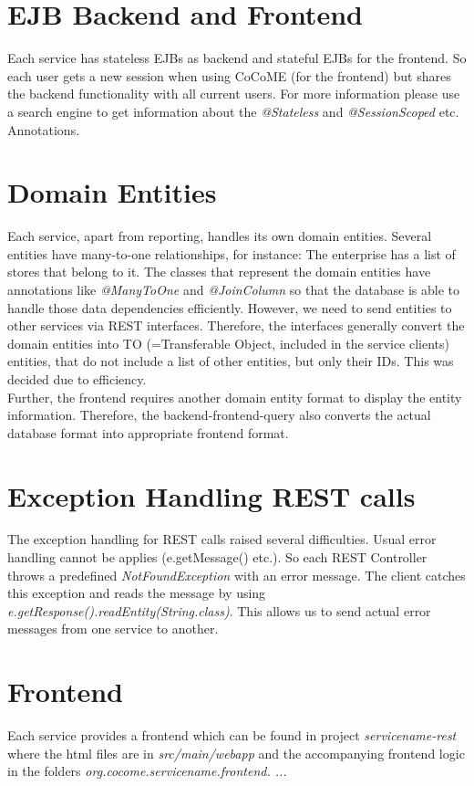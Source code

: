 \section{EJB Backend and Frontend}
Each service has stateless EJBs as backend and stateful EJBs for the frontend. So each user gets a new session when using CoCoME (for the frontend) but shares the backend functionality with all current users. For more information please use a search engine to get information about the \textit{@Stateless} and \textit{@SessionScoped} etc. Annotations.

\section{Domain Entities}
Each service, apart from reporting, handles its own domain entities.
Several entities have many-to-one relationships, for instance: The enterprise has a list of stores that belong to it. The classes that represent the domain entities have annotations like \textit{@ManyToOne} and \textit{@JoinColumn} so that the database is able to handle those data dependencies efficiently. However, we need to send entities to other services via REST interfaces. Therefore, the interfaces generally convert the domain entities into TO (=Transferable Object, included in the service clients) entities, that do not include a list of other entities, but only their IDs. This was decided due to efficiency. \\
Further, the frontend requires another domain entity format to display the entity information. Therefore, the backend-frontend-query also converts the actual database format into appropriate frontend format.

\section{Exception Handling REST calls}
The exception handling for REST calls raised several difficulties. Usual error handling cannot be applies (e.getMessage() etc.). So each REST Controller throws a predefined \textit{NotFoundException} with an error message. The client catches this exception and reads the message by using \textit{e.getResponse().readEntity(String.class)}. This allows us to send actual error messages from one service to another.

\section{Frontend}
Each service provides a frontend which can be found in project \textit{servicename-rest} where the html files are in \textit{src/main/webapp} and the accompanying frontend logic in the folders \textit{org.cocome.servicename.frontend. ...} 

